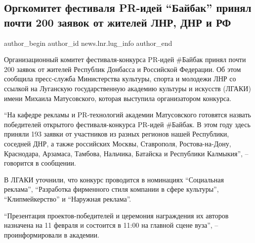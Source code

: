  
 
 
 
 
 
\subsection{Оргкомитет фестиваля PR-идей \enquote{Байбак} принял почти 200 заявок от жителей ЛНР, ДНР и РФ}
\label{sec:24_01_2022.stz.news.lnr.lug_info.1.festival_bajbak}
 
\ifcmt
 author_begin
   author_id news.lnr.lug_info
 author_end
\fi

Организационный комитет фестиваля-конкурса PR-идей \#Байбак принял почти 200
заявок от жителей Республик Донбасса и Российской Федерации. Об этом сообщила
пресс-служба Министерства культуры, спорта и молодежи ЛНР со ссылкой на
Луганскую государственную академию культуры и искусств (ЛГАКИ) имени Михаила
Матусовского, которая выступила организатором конкурса.


\enquote{На кафедре рекламы и PR-технологий академии Матусовского готовятся
назвать победителей открытого фестиваля-конкурса PR-идей \#Байбак. В этом году
здесь приняли 193 заявки от участников из разных регионов нашей Республики,
соседней ДНР, а также российских Москвы, Ставрополя, Ростова-на-Дону,
Краснодара, Арзамаса, Тамбова, Нальчика, Батайска и Республики Калмыкия}, –
говорится в сообщении.

В ЛГАКИ уточнили, что конкурс проводится в номинациях \enquote{Социальная
реклама}, \enquote{Разработка фирменного стиля компании в сфере культуры},
\enquote{Клипмейкерство} и \enquote{Наружная реклама}.

\enquote{Презентация проектов-победителей и церемония награждения их авторов
назначена на 11 февраля и состоится в 11:00 на главной сцене вуза}, –
проинформировали в академии.

